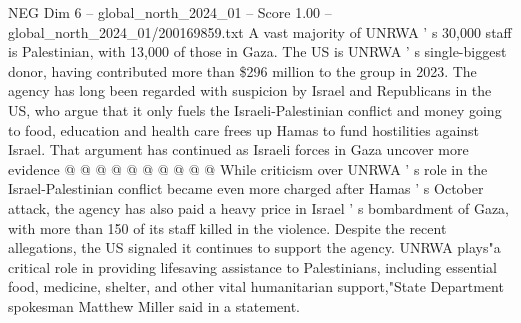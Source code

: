 \begin{textsample}{NEG Dim 6 – global\_north\_2024\_01 – Score 1.00 – global\_north\_2024\_01/200169859.txt}
A vast majority of UNRWA ' s 30,000 staff is Palestinian, with 13,000 of those in Gaza.
The US is UNRWA ' s single-biggest donor, having contributed more than \$296 million to the group in 2023.
The agency has long been regarded with suspicion by Israel and Republicans in the US, who argue that it only fuels the Israeli-Palestinian conflict and money going to food, education and health care frees up Hamas to fund hostilities against Israel.
That argument has continued as Israeli forces in Gaza uncover more evidence @ @ @ @ @ @ @ @ @ @ While criticism over UNRWA ' s role in the Israel-Palestinian conflict became even more charged after Hamas ' s October attack, the agency has also paid a heavy price in Israel ' s bombardment of Gaza, with more than 150 of its staff killed in the violence.
Despite the recent allegations, the US signaled it continues to support the agency.
UNRWA plays"a critical role in providing lifesaving assistance to Palestinians, including essential food, medicine, shelter, and other vital humanitarian support,"State Department spokesman Matthew Miller said in a statement.

\end{textsample}
